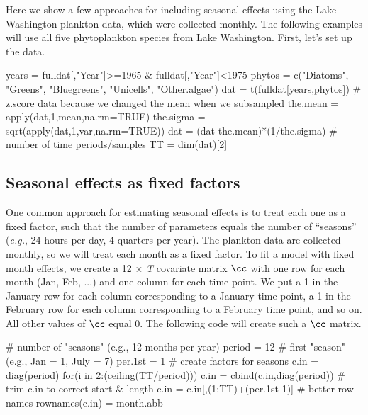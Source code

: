 Here we show a few approaches for including seasonal effects using the Lake Washington plankton data, which were collected monthly.  The following examples will use all five phytoplankton species from Lake Washington.  First, let's set up the data.
\begin{Schunk}
\begin{Sinput}
 years = fulldat[,"Year"]>=1965 & fulldat[,"Year"]<1975
 phytos = c("Diatoms", "Greens", "Bluegreens",
            "Unicells", "Other.algae")
 dat = t(fulldat[years,phytos])
 # z.score data because we changed the mean when we subsampled
 the.mean = apply(dat,1,mean,na.rm=TRUE)
 the.sigma = sqrt(apply(dat,1,var,na.rm=TRUE))
 dat = (dat-the.mean)*(1/the.sigma)
 # number of time periods/samples
 TT = dim(dat)[2]
\end{Sinput}
\end{Schunk}


\subsection{Seasonal effects as fixed factors}

One common approach for estimating seasonal effects is to treat each one as a fixed factor, such that the number of parameters equals the number of ``seasons'' (\emph{e.g.}, 24 hours per day, 4 quarters per year). The plankton data are collected monthly, so we will treat each month as a fixed factor.  To fit a model with fixed month effects, we create a 12 $\times$ \emph{T} covariate matrix $\cc$ with one row for each month (Jan, Feb, ...) and one column for each time point. We put a 1 in the January row for each column corresponding to a January time point, a 1 in the February row for each column corresponding to a February time point, and so on. All other values of $\cc$ equal 0. The following code will create such a $\cc$ matrix.
\begin{Schunk}
\begin{Sinput}
 # number of "seasons" (e.g., 12 months per year)
 period = 12
 # first "season" (e.g., Jan = 1, July = 7)
 per.1st = 1
 # create factors for seasons
 c.in = diag(period)
 for(i in 2:(ceiling(TT/period))) {c.in = cbind(c.in,diag(period))}
 # trim c.in to correct start & length
 c.in = c.in[,(1:TT)+(per.1st-1)]
 # better row names
 rownames(c.in) = month.abb
\end{Sinput}
\end{Schunk}

